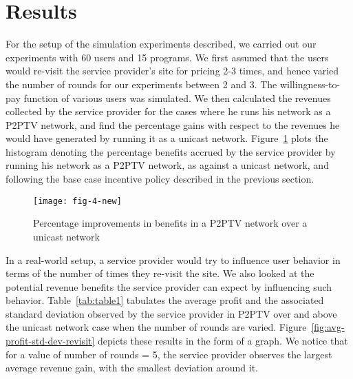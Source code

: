 \documentclass[conference,a4paper]{IEEEtran}
\begin{document}
\section{Results}
\label{sec:results}
For the setup of the simulation experiments described, we carried out our experiments with 60 users and 15 programs. We first assumed that the users would re-visit the service provider's site for pricing 2-3 times, and hence varied the number of rounds for our experiments between 2 and 3. The willingness-to-pay function of various users was simulated. We then calculated the revenues collected by the service provider for the cases where he runs his network as a P2PTV network, and find the percentage gains with respect to the revenues he would have generated by running it as a unicast network. Figure~\ref{fig:content-provider-benefits} plots the histogram denoting the percentage benefits accrued by the service provider by running his network as a P2PTV network, as against a unicast network, and following the base case incentive policy described in the previous section. 

\begin{figure}
  \texttt{[image: fig-4-new]}
  \caption{Percentage improvements in benefits in a P2PTV network over a unicast network}
  \label{fig:content-provider-benefits}
\end{figure}

In a real-world setup, a service provider would try to influence user behavior in terms of the number of times they re-visit the site. We also looked at the potential revenue benefits the service provider can expect by influencing such behavior. Table~\ref{tab:table1} tabulates the average profit and the associated standard deviation observed by the service provider in P2PTV over and above the unicast network case when the number of rounds are varied. Figure~\ref{fig:avg-profit-std-dev-revisit} depicts these results in the form of a graph. We notice that for a value of number of rounds = 5, the service provider observes the largest average revenue gain, with the smallest deviation around it. 
\end{document}
